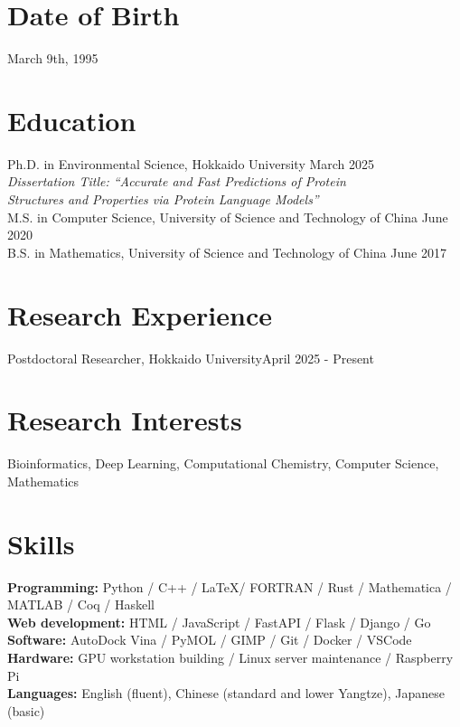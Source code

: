 \documentclass[a4paper,11pt]{article}
\begin{document}
\vspace{0.5cm}

\section*{Date of Birth}
March 9th, 1995
\section*{Education}
Ph.D. in Environmental Science, Hokkaido University \hfill March 2025\\
\textit{Dissertation Title: ``Accurate and Fast Predictions of Protein\\
Structures and Properties via Protein Language Models''}\\
M.S. in Computer Science, University of Science and Technology of China \hfill June 2020\\
B.S. in Mathematics, University of Science and Technology of China \hfill June 2017
\section*{Research Experience}
Postdoctoral Researcher, Hokkaido University\hfill April 2025 - Present\\

\section*{Research Interests}
Bioinformatics, Deep Learning, Computational Chemistry, Computer Science, Mathematics
\section*{Skills}
\textbf{Programming:} Python / C++ / \LaTeX / FORTRAN / Rust / Mathematica / MATLAB / Coq / Haskell\\
\textbf{Web development:} HTML / JavaScript / FastAPI / Flask / Django / Go\\
\textbf{Software:} AutoDock Vina / PyMOL / GIMP / Git / Docker / VSCode\\
\textbf{Hardware:} GPU workstation building / Linux server maintenance / Raspberry Pi\\
\textbf{Languages:} English (fluent), Chinese (standard and lower Yangtze), Japanese (basic)
\end{document}
